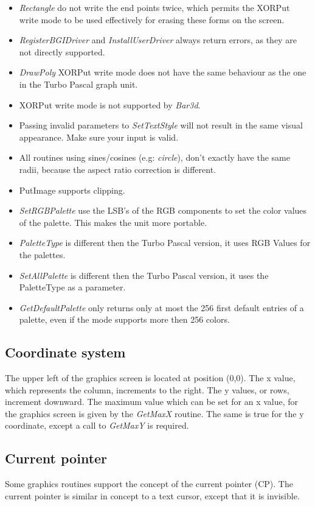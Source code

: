 \begin{itemize}
\item \textit{Rectangle} do not write
  the end points twice, which permits the XORPut write mode to be used
  effectively for erasing these forms on the screen.
\item \textit{RegisterBGIDriver} and \textit{InstallUserDriver} always
  return errors, as they are not directly supported.
\item \textit{DrawPoly} XORPut write mode does not have the same behaviour
 as the one in the Turbo Pascal graph unit.
\item XORPut write mode is not supported by \textit{Bar3d}.
\item Passing invalid parameters to \textit{SetTextStyle} will not
  result in the same visual appearance. Make sure your input is valid.
\item All routines using sines/cosines (e.g: \textit{circle}), don't
 exactly have the same radii, because the aspect ratio correction is
 different.
\item PutImage supports clipping.
\item \textit{SetRGBPalette} use the LSB's of the RGB components to
set the color values of the palette. This makes the unit more portable.
\item \textit{PaletteType} is different then the Turbo Pascal version,
  it uses RGB Values for the palettes.
\item \textit{SetAllPalette} is different then the Turbo Pascal version,
  it uses the PaletteType as a parameter.
\item \textit{GetDefaultPalette} only returns only at most the 256 first
  default entries of a palette, even if the mode supports more then
  256 colors.
\end{itemize}

\subsection{Coordinate system}
The upper left of the graphics screen is located at position (0,0). The x
value, which represents the column, increments to the right. The y values,
or rows, increment downward. The maximum value which can be set for an x
value, for the graphics screen is given by the \textit{GetMaxX} routine.
The same is true for the y coordinate, except a call to \textit{GetMaxY}
is required.

\subsection{Current pointer}
Some graphics routines support the concept of the current pointer (CP). The
current pointer is similar in concept to a text cursor, except that it is
invisible.

